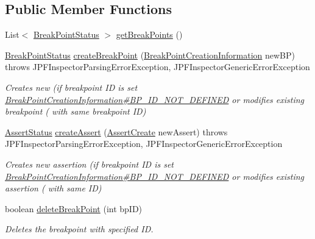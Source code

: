 \subsection*{Public Member Functions}
\begin{DoxyCompactItemize}
\item 
List$<$ \hyperlink{interfacegov_1_1nasa_1_1jpf_1_1inspector_1_1interfaces_1_1_break_point_status}{Break\+Point\+Status} $>$ \hyperlink{interfacegov_1_1nasa_1_1jpf_1_1inspector_1_1interfaces_1_1_break_point_manager_interface_a172b70b66d0f8f6564111ee60efede2c}{get\+Break\+Points} ()
\item 
\hyperlink{interfacegov_1_1nasa_1_1jpf_1_1inspector_1_1interfaces_1_1_break_point_status}{Break\+Point\+Status} \hyperlink{interfacegov_1_1nasa_1_1jpf_1_1inspector_1_1interfaces_1_1_break_point_manager_interface_a9a11e594662011fd492b60b6cbb8ffbf}{create\+Break\+Point} (\hyperlink{interfacegov_1_1nasa_1_1jpf_1_1inspector_1_1interfaces_1_1_break_point_creation_information}{Break\+Point\+Creation\+Information} new\+BP)  throws J\+P\+F\+Inspector\+Parsing\+Error\+Exception, J\+P\+F\+Inspector\+Generic\+Error\+Exception
\begin{DoxyCompactList}\small\item\em Creates new (if breakpoint ID is set \hyperlink{interfacegov_1_1nasa_1_1jpf_1_1inspector_1_1interfaces_1_1_break_point_creation_information_a24626231e3744e59f505d0731d4ca9e1}{Break\+Point\+Creation\+Information\#\+B\+P\+\_\+\+I\+D\+\_\+\+N\+O\+T\+\_\+\+D\+E\+F\+I\+N\+ED} or modifies existing breakpoint ( with same breakpoint ID) \end{DoxyCompactList}\item 
\hyperlink{interfacegov_1_1nasa_1_1jpf_1_1inspector_1_1interfaces_1_1_assert_status}{Assert\+Status} \hyperlink{interfacegov_1_1nasa_1_1jpf_1_1inspector_1_1interfaces_1_1_break_point_manager_interface_a835295e3e429bd405ba3acec21f5193e}{create\+Assert} (\hyperlink{interfacegov_1_1nasa_1_1jpf_1_1inspector_1_1interfaces_1_1_assert_create}{Assert\+Create} new\+Assert)  throws J\+P\+F\+Inspector\+Parsing\+Error\+Exception, J\+P\+F\+Inspector\+Generic\+Error\+Exception
\begin{DoxyCompactList}\small\item\em Creates new assertion (if breakpoint ID is set \hyperlink{interfacegov_1_1nasa_1_1jpf_1_1inspector_1_1interfaces_1_1_break_point_creation_information_a24626231e3744e59f505d0731d4ca9e1}{Break\+Point\+Creation\+Information\#\+B\+P\+\_\+\+I\+D\+\_\+\+N\+O\+T\+\_\+\+D\+E\+F\+I\+N\+ED} or modifies existing assertion ( with same ID) \end{DoxyCompactList}\item 
boolean \hyperlink{interfacegov_1_1nasa_1_1jpf_1_1inspector_1_1interfaces_1_1_break_point_manager_interface_a1b117659c4230581c31e5c5448675bcd}{delete\+Break\+Point} (int bp\+ID)
\begin{DoxyCompactList}\small\item\em Deletes the breakpoint with specified ID. \end{DoxyCompactList}\end{DoxyCompactItemize}


